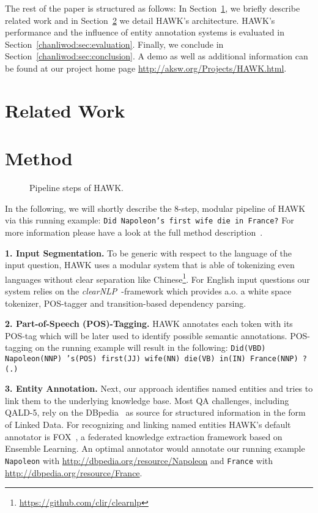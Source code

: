 The rest of the paper is structured as follows:
In Section~\ref{chanliwod:sec:relatedwork}, we briefly describe related work and in Section~\ref{chanliwod:sec:method} we detail HAWK's architecture.
HAWK's performance and the influence of entity annotation systems is evaluated in Section~\ref{chanliwod:sec:evaluation}. 
Finally, we conclude in Section~\ref{chanliwod:sec:conclusion}. 
A demo as well as additional information can be found at our project home page \url{http://aksw.org/Projects/HAWK.html}.


\section{Related Work} 
\label{chanliwod:sec:relatedwork}


\section{Method}
\label{chanliwod:sec:method}
\begin{figure}[htb!]
\centering

\caption{Pipeline steps of HAWK.}
\label{fig:hawk_pipeline}
\end{figure}


In the following, we will shortly describe the 8-step, modular pipeline of HAWK via this running example: \texttt{Did Napoleon's first wife die in France?}
For more information please have a look at the full method description~\cite{hawk_2015}.


\textbf{1. Input Segmentation.} 
To be generic with respect to the language of the input question, HAWK uses a modular system that is able of tokenizing even languages without clear separation like Chinese\footnote{\url{https://github.com/clir/clearnlp}}.
For English input questions our system relies on the \emph{clearNLP}~\cite{choi2011getting}-framework which provides a.o. a white space tokenizer, POS-tagger and transition-based dependency parsing.

\textbf{2. Part-of-Speech (POS)-Tagging.} 
HAWK annotates each token with its POS-tag which will be later used to identify possible semantic annotations. 
POS-tagging on the running example will result in the following: \texttt{Did(VBD) Napoleon(NNP) 's(POS) first(JJ) wife(NN) die(VB) in(IN) France(NNP) ?(.)}

\textbf{3. Entity Annotation.} 
Next, our approach identifies named entities and tries to link them to the underlying knowledge base. 
Most QA challenges, including QALD-5, rely on the DBpedia~\cite{jl_2014/swj_dbpedia} as source for structured information in the form of Linked Data. 
For recognizing and linking named entities HAWK's default annotator is FOX~\cite{FOX}, a federated knowledge extraction framework based on Ensemble Learning. 
An optimal annotator would annotate our running example \texttt{Napoleon} with \url{http://dbpedia.org/resource/Napoleon} and \texttt{France} with \url{http://dbpedia.org/resource/France}.

